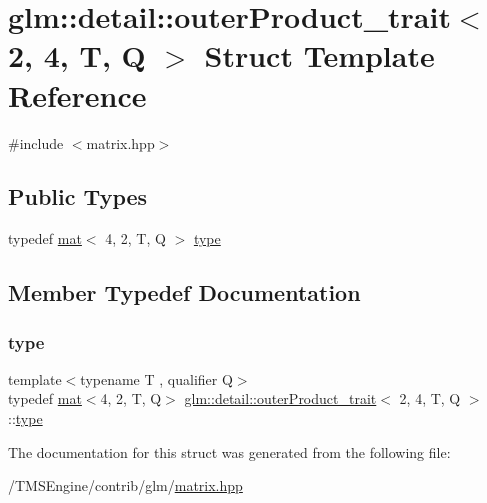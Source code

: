 \hypertarget{structglm_1_1detail_1_1outer_product__trait_3_012_00_014_00_01_t_00_01_q_01_4}{}\section{glm\+:\+:detail\+:\+:outer\+Product\+\_\+trait$<$ 2, 4, T, Q $>$ Struct Template Reference}
\label{structglm_1_1detail_1_1outer_product__trait_3_012_00_014_00_01_t_00_01_q_01_4}


{\ttfamily \#include $<$matrix.\+hpp$>$}

\subsection*{Public Types}
\begin{DoxyCompactItemize}
\item 
typedef \hyperlink{structglm_1_1mat}{mat}$<$ 4, 2, T, Q $>$ \hyperlink{structglm_1_1detail_1_1outer_product__trait_3_012_00_014_00_01_t_00_01_q_01_4_a25bc2e0604357ef39ab2a35015b1f9c8}{type}
\end{DoxyCompactItemize}


\subsection{Member Typedef Documentation}
\mbox{\label{structglm_1_1detail_1_1outer_product__trait_3_012_00_014_00_01_t_00_01_q_01_4_a25bc2e0604357ef39ab2a35015b1f9c8}} 
\subsubsection{\texorpdfstring{type}{type}}
{\footnotesize\ttfamily template$<$typename T , qualifier Q$>$ \\
typedef \hyperlink{structglm_1_1mat}{mat}$<$4, 2, T, Q$>$ \hyperlink{structglm_1_1detail_1_1outer_product__trait}{glm\+::detail\+::outer\+Product\+\_\+trait}$<$ 2, 4, T, Q $>$\+::\hyperlink{structglm_1_1detail_1_1outer_product__trait_3_012_00_014_00_01_t_00_01_q_01_4_a25bc2e0604357ef39ab2a35015b1f9c8}{type}}



The documentation for this struct was generated from the following file\+:\begin{DoxyCompactItemize}
\item 
/\+T\+M\+S\+Engine/contrib/glm/\hyperlink{matrix_8hpp}{matrix.\+hpp}\end{DoxyCompactItemize}
